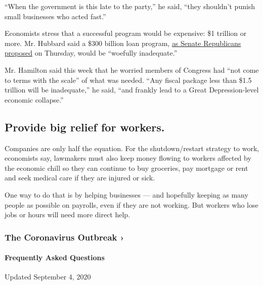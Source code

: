``When the government is this late to the party,'' he said, ``they
shouldn't punish small businesses who acted fast.''

Economists stress that a successful program would be expensive: \$1
trillion or more. Mr. Hubbard said a \$300 billion loan program,
\href{https://www.nytimes3xbfgragh.onion/2020/03/19/us/politics/1000-checks-coronavirus-stimulus.html}{as
Senate Republicans proposed} on Thursday, would be ``woefully
inadequate.''

Mr. Hamilton said this week that he worried members of Congress had
``not come to terms with the scale'' of what was needed. ``Any fiscal
package less than \$1.5 trillion will be inadequate,'' he said, ``and
frankly lead to a Great Depression-level economic collapse.''

\hypertarget{provide-big-relief-for-workers}{%
\subsection{Provide big relief for
workers.}\label{provide-big-relief-for-workers}}

Companies are only half the equation. For the shutdown/restart strategy
to work, economists say, lawmakers must also keep money flowing to
workers affected by the economic chill so they can continue to buy
groceries, pay mortgage or rent and seek medical care if they are
injured or sick.

One way to do that is by helping businesses --- and hopefully keeping as
many people as possible on payrolls, even if they are not working. But
workers who lose jobs or hours will need more direct help.

\href{https://www.nytimes3xbfgragh.onion/news-event/coronavirus?action=click\&pgtype=Article\&state=default\&region=MAIN_CONTENT_3\&context=storylines_faq}{}

\hypertarget{the-coronavirus-outbreak-}{%
\subsubsection{The Coronavirus Outbreak
›}\label{the-coronavirus-outbreak-}}

\hypertarget{frequently-asked-questions}{%
\paragraph{Frequently Asked
Questions}\label{frequently-asked-questions}}

Updated September 4, 2020

